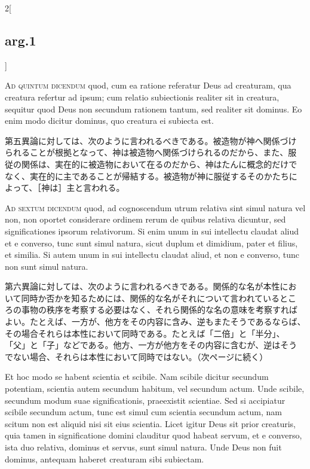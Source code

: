 \documentclass[paper=a4paper,fontsize=10pt,jafontsize=9pt,titlepage]{jlreq}
\begin{document}
\begin{paracol}{2}[\subsection{arg.1}]
\switchcolumn*[\subsection{ad.5}]

{\scshape Ad quintum dicendum} quod, cum ea ratione referatur Deus ad
creaturam, qua creatura refertur ad ipsum; cum relatio subiectionis
realiter sit in creatura, sequitur quod Deus non secundum rationem
tantum, sed realiter sit dominus. Eo enim modo dicitur dominus, quo
creatura ei subiecta est.

\switchcolumn

第五異論に対しては、次のように言われるべきである。被造物が神へ関係づけ
られることが根拠となって、神は被造物へ関係づけられるのだから、また、服
従の関係は、実在的に被造物において在るのだから、神はたんに概念的だけで
なく、実在的に主であることが帰結する。被造物が神に服従するそのかたちに
よって、［神は］主と言われる。

\switchcolumn*[\subsection{ad.6}]

{\scshape Ad sextum dicendum} quod, ad cognoscendum utrum relativa
sint simul natura vel non, non oportet considerare ordinem rerum de
quibus relativa dicuntur, sed significationes ipsorum relativorum. Si
enim unum in sui intellectu claudat aliud et e converso, tunc sunt
simul natura, sicut duplum et dimidium, pater et filius, et
similia. Si autem unum in sui intellectu claudat aliud, et non e
converso, tunc non sunt simul natura.

\switchcolumn

第六異論に対しては、次のように言われるべきである。関係的な名が本性にお
いて同時か否かを知るためには、関係的な名がそれについて言われているとこ
ろの事物の秩序を考察する必要はなく、それら関係的な名の意味を考察すれば
よい。たとえば、一方が、他方をその内容に含み、逆もまたそうであるならば、
その場合それらは本性において同時である。たとえば「二倍」と「半分」、
「父」と「子」などである。他方、一方が他方をその内容に含むが、逆はそう
でない場合、それらは本性において同時ではない。（次ページに続く）

\switchcolumn*

Et hoc modo se habent scientia et scibile. Nam scibile dicitur
secundum potentiam, scientia autem secundum habitum, vel secundum
actum. Unde scibile, secundum modum suae significationis, praeexistit
scientiae. Sed si accipiatur scibile secundum actum, tunc est simul
cum scientia secundum actum, nam scitum non est aliquid nisi sit eius
scientia. Licet igitur Deus sit prior creaturis, quia tamen in
significatione domini clauditur quod habeat servum, et e converso,
ista duo relativa, dominus et servus, sunt simul natura. Unde Deus non
fuit dominus, antequam haberet creaturam sibi subiectam.


\end{paracol}
\end{document}
